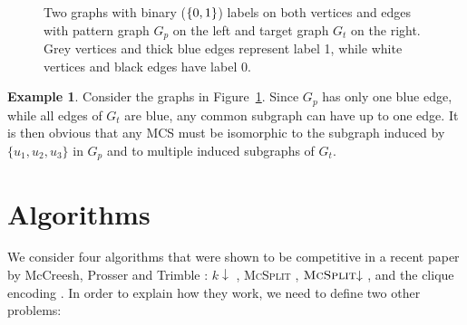 \documentclass{l4proj}
\theoremstyle{definition}
\newtheorem{example}{Example}[chapter]
\theoremstyle{remark}
\begin{document}
\begin{figure}
  \centering
  \caption{Two graphs with binary ($\protect{\{ 0, 1 \}}$) labels on both vertices
    and edges with pattern graph $G_p$ on the left and target graph $G_t$ on the
    right. Grey vertices and thick blue edges represent label 1, while white
    vertices and black edges have label 0.}
  \label{fig:graphs}
\end{figure}

\begin{example}
  Consider the graphs in Figure~\ref{fig:graphs}. Since $G_p$ has only one blue
  edge, while all edges of $G_t$ are blue, any common subgraph can have up to
  one edge. It is then obvious that any MCS must be isomorphic to the subgraph
  induced by $\{ u_1, u_2, u_3 \}$ in $G_p$ and to multiple induced subgraphs of $G_t$.
\end{example}

\section{Algorithms}

We consider four algorithms that were shown to be competitive in a recent paper by
McCreesh, Prosser and Trimble \cite{DBLP:conf/ijcai/McCreeshPT17}: $k{\downarrow}$
\cite{DBLP:conf/aaai/HoffmannMR17}, \textsc{McSplit}
\cite{DBLP:conf/ijcai/McCreeshPT17}, $\textsc{McSplit}{\downarrow}$
\cite{DBLP:conf/ijcai/McCreeshPT17}, and the clique encoding
\cite{DBLP:conf/cp/McCreeshNPS16}. In order to explain how they work, we need to
define two other problems:
\end{document}
